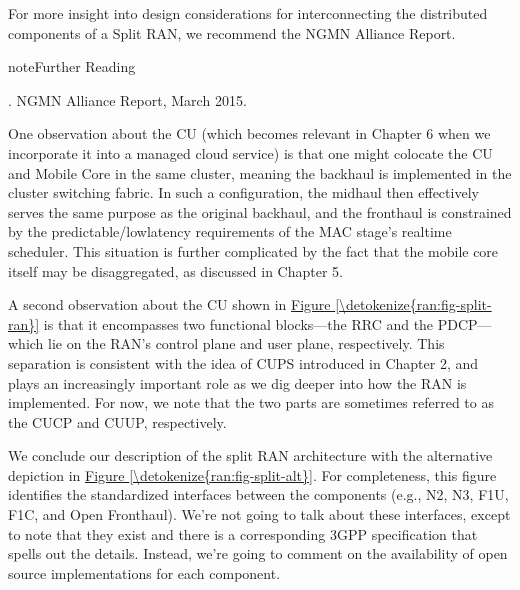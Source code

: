 \documentclass[a4paper,11pt,english]{sphinxmanual}
\begin{document}
\sphinxAtStartPar
For more insight into design considerations for interconnecting the
distributed components of a Split RAN, we recommend the NGMN Alliance
Report.

\label{\detokenize{ran:reading-backhaul}}
\begin{sphinxadmonition}{note}{Further Reading}

\sphinxAtStartPar
{}.
NGMN Alliance Report, March 2015.
\end{sphinxadmonition}

\sphinxAtStartPar
One observation about the CU (which becomes relevant in Chapter 6 when
we incorporate it into a managed cloud service) is that one might
co\sphinxhyphen{}locate the CU and Mobile Core in the same cluster, meaning the
backhaul is implemented in the cluster switching fabric. In such a
configuration, the midhaul then effectively serves the same purpose as
the original backhaul, and the fronthaul is constrained by the
predictable/low\sphinxhyphen{}latency requirements of the MAC stage’s real\sphinxhyphen{}time
scheduler. This situation is further complicated by the fact that the
mobile core itself may be disaggregated, as discussed in Chapter 5.

\sphinxAtStartPar
A second observation about the CU shown in \hyperref[\detokenize{ran:fig-split-ran}]{Figure \ref{\detokenize{ran:fig-split-ran}}} is that it encompasses two functional blocks—the RRC
and the PDCP—which lie on the RAN’s control plane and user plane,
respectively. This separation is consistent with the idea of CUPS
introduced in Chapter 2, and plays an increasingly important role as
we dig deeper into how the RAN is implemented. For now, we note that
the two parts are sometimes referred to as the CU\sphinxhyphen{}CP and CU\sphinxhyphen{}UP,
respectively.

\sphinxAtStartPar
We conclude our description of the split RAN architecture with the
alternative depiction in \hyperref[\detokenize{ran:fig-split-alt}]{Figure \ref{\detokenize{ran:fig-split-alt}}}.
For completeness, this figure identifies the standardized interfaces
between the components (e.g., N2, N3, F1\sphinxhyphen{}U, F1\sphinxhyphen{}C, and Open Fronthaul).
We’re not going to talk about these interfaces, except to note that
they exist and there is a corresponding 3GPP specification that spells
out the details. Instead, we’re going to comment on the availability
of open source implementations for each component.
\end{document}
